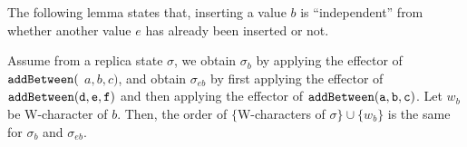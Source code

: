 The following lemma states that, inserting a value $b$ is ``independent'' from whether another value $e$ has already been inserted or not.

\begin{lemma}
\label{lemma:in Wooki algorithm,the order of sigma and b is the same, between insert b and first insert e and then insert b}
Assume from a replica state $\sigma$, we obtain $\sigma_b$ by applying the effector of ${\tt addBetween}($ $a,b,c)$, and obtain $\sigma_{eb}$ by first applying the effector of $\alabelshort[{\tt addBetween}]{d,e,f}$ and then applying the effector of $\alabelshort[{\tt addBetween}]{a,b,c}$. Let $w_b$ be W-character of $b$. Then, the order of $\{$W-characters of $\sigma \} \cup \{ w_b \}$ is the same for $\sigma_b$ and $\sigma_{eb}$.
\end{lemma}

